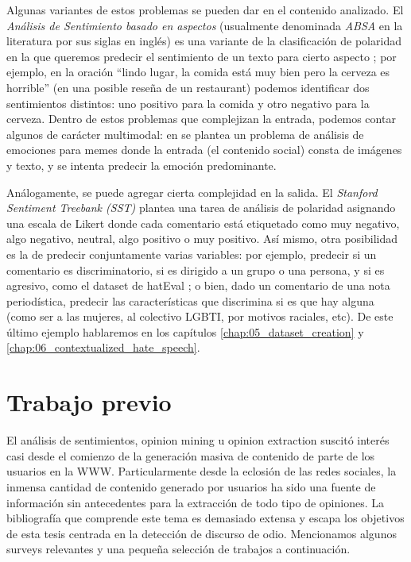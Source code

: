 Algunas variantes de estos problemas se pueden dar en el contenido analizado. El \emph{Análisis de Sentimiento basado en aspectos} (usualmente denominada \emph{ABSA} en la literatura por sus siglas en inglés) es una variante de la clasificación de polaridad en la que queremos predecir el sentimiento de un texto para cierto aspecto \cite{pavlopoulos2014aspect}; por ejemplo, en la oración ``lindo lugar, la comida está muy bien pero la cerveza es horrible'' (en una posible reseña de un restaurant) podemos identificar dos sentimientos distintos: uno positivo para la comida y otro negativo para la cerveza. Dentro de estos problemas que complejizan la entrada, podemos contar algunos de carácter multimodal: en \citet{sharma-etal-2020-semeval} se plantea un problema de análisis de emociones para memes donde la entrada (el contenido social) consta de imágenes y texto, y se intenta predecir la emoción predominante.

Análogamente, se puede agregar cierta complejidad en la salida. El \emph{Stanford Sentiment Treebank (SST)} \cite{socher-etal-2013-recursive} plantea una tarea de análisis de polaridad asignando una escala de Likert \cite{likert1932technique} donde cada comentario está etiquetado como muy negativo, algo negativo, neutral, algo positivo o muy positivo. Así mismo, otra posibilidad es la de predecir conjuntamente varias variables: por ejemplo, predecir si un comentario es discriminatorio, si es dirigido a un grupo o una persona, y si es agresivo, como el dataset de hatEval \cite{hateval2019semeval}; o bien, dado un comentario de una nota periodística, predecir las características que discrimina si es que hay alguna (como ser a las mujeres, al colectivo LGBTI, por motivos raciales, etc). De este último ejemplo hablaremos en los capítulos \ref{chap:05_dataset_creation} y \ref{chap:06_contextualized_hate_speech}.


\section{Trabajo previo}

El análisis de sentimientos, opinion mining u opinion extraction suscitó interés casi desde el comienzo de la generación masiva de contenido de parte de los usuarios en la WWW. Particularmente desde la eclosión de las redes sociales, la inmensa cantidad de contenido generado por usuarios ha sido una fuente de información sin antecedentes para la extracción de todo tipo de opiniones. La bibliografía que comprende este tema es demasiado extensa y escapa los objetivos de esta tesis centrada en la detección de discurso de odio. Mencionamos algunos surveys relevantes y una pequeña selección de trabajos a continuación.


